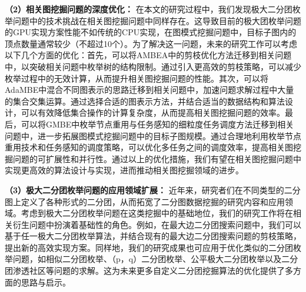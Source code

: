 \textbf{（2）相关图挖掘问题的深度优化：} 在本文的研究过程中，我们发现极大二分团枚举问题中的技术挑战在相关图挖掘问题中同样存在。这导致目前的极大团枚举问题的GPU实现方案性能不如传统的CPU实现，在图模式挖掘问题中，目标子图内的顶点数量通常较少（不超过10个）。为了解决这一问题，未来的研究工作可以考虑以下几个方面的优化：首先，可以将AMBEA中的剪枝优化方法迁移到相关问题中，以突破相关问题中枚举树的结构限制。通过引入更高效的剪枝策略，可以减少枚举过程中的无效计算，从而提升相关图挖掘问题的性能。其次，可以将AdaMBE中混合不同图表示的思路迁移到相关问题中，加速问题求解过程中大量的集合交集运算。通过选择合适的图表示方法，并结合适当的数据结构和算法设计，可以有效降低集合操作的计算复杂度，从而提高相关图挖掘问题的效率。最后，可以将GMBE中枚举节点重用与任务感知的细粒度任务调度方法迁移到相关问题中，进一步拓展图模式挖掘问题中的目标子图规模。通过合理地利用枚举节点重用技术和任务感知的调度策略，可以优化多任务之间的调度效率，提高相关图挖掘问题的可扩展性和并行性。通过以上的优化措施，我们有望在相关图挖掘问题中实现更高效的算法设计与实现，进而推动相关图挖掘领域的进步。

\textbf{（3）极大二分团枚举问题的应用领域扩展：} 近年来，研究者们在不同类型的二分图上定义了各种形式的二分团，从而拓宽了二分图数据挖掘的研究内容和应用领域。考虑到极大二分团枚举问题在这类挖掘中的基础地位，我们的研究工作将在相关衍生问题中扮演着基础性的角色。例如，在最大边二分团搜索问题中，我们可以基于任一极大二分团枚举算法，并结合现有的最大边二分团搜索问题的剪枝策略，提出新的高效实现方案。同样地，我们的研究成果也可应用于优化类似的二分团枚举问题，如相似二分团枚举、（p，q）二分团枚举、公平极大二分团枚举以及二分团渗透社区等问题的求解。这为未来更多自定义二分团挖掘算法的优化提供了多方面的思路与启示。